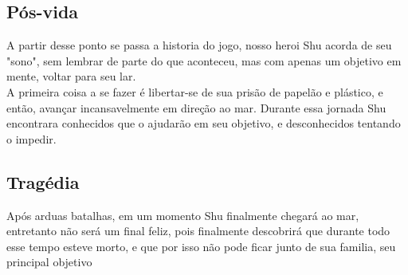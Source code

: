     \subsection{Pós-vida}%
A partir desse ponto se passa a historia do jogo, nosso heroi Shu acorda de seu "sono", sem lembrar de parte do que aconteceu, mas com apenas um objetivo em mente, voltar para seu lar.\\
A primeira coisa a se fazer é libertar-se de sua prisão de papelão e plástico, e então, avançar incansavelmente em direção ao mar. Durante essa jornada Shu encontrara conhecidos que o ajudarão em seu objetivo, e desconhecidos tentando o impedir.\\
    \subsection{Tragédia}%
Após arduas batalhas, em um momento Shu finalmente chegará ao mar, entretanto não será um final feliz, pois finalmente descobrirá que durante todo esse tempo esteve morto, e que por isso não pode ficar junto de sua familia, seu principal objetivo
